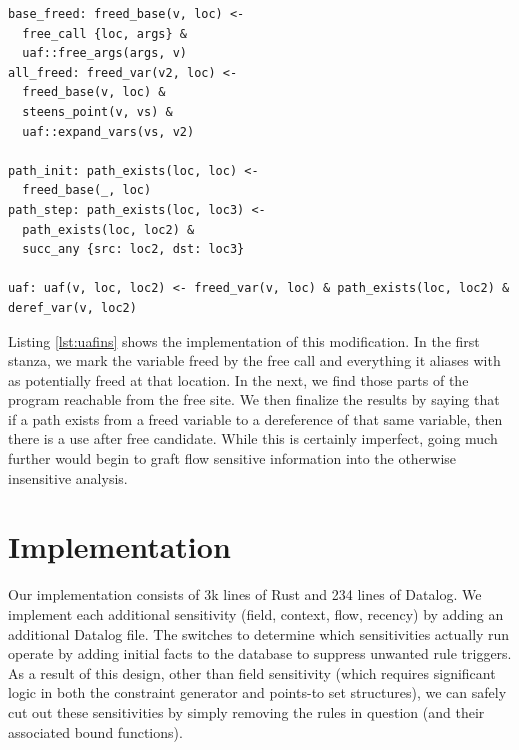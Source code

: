 \begin{lstlisting}[label=lst:uafins, caption={Tracking Frees Insensitively}]
base_freed: freed_base(v, loc) <-
  free_call {loc, args} &
  uaf::free_args(args, v)
all_freed: freed_var(v2, loc) <-
  freed_base(v, loc) &
  steens_point(v, vs) &
  uaf::expand_vars(vs, v2)

path_init: path_exists(loc, loc) <-
  freed_base(_, loc)
path_step: path_exists(loc, loc3) <-
  path_exists(loc, loc2) &
  succ_any {src: loc2, dst: loc3}

uaf: uaf(v, loc, loc2) <- freed_var(v, loc) & path_exists(loc, loc2) & deref_var(v, loc2)
\end{lstlisting}

Listing \ref{lst:uafins} shows the implementation of this modification.
In the first stanza, we mark the variable freed by the free call and everything it aliases with as potentially freed at that location.
In the next, we find those parts of the program reachable from the free site.
We then finalize the results by saying that if a path exists from a freed variable to a dereference of that same variable, then there is a use after free candidate.
While this is certainly imperfect, going much further would begin to graft flow sensitive information into the otherwise insensitive analysis.

\section{Implementation}
\label{alias:sec:impl}
Our implementation consists of 3k lines of Rust and 234 lines of Datalog.
We implement each additional sensitivity (field, context, flow, recency) by adding an additional Datalog file.
The switches to determine which sensitivities actually run operate by adding initial facts to the database to suppress unwanted rule triggers.
As a result of this design, other than field sensitivity (which requires significant logic in both the constraint generator and points-to set structures), we can safely cut out these sensitivities by simply removing the rules in question (and their associated bound functions).

